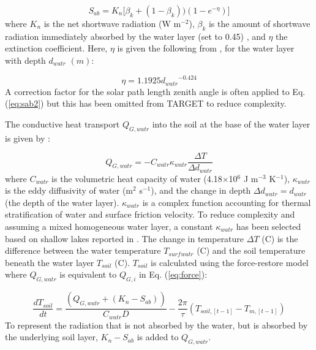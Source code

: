 \documentclass[gmd, manuscript]{copernicus}
\begin{document}
\begin{equation} 
\ensuremath{S_{ab}} = \ensuremath{K_{n}} \big[ \ensuremath{\beta_{k}} + (1 - \ensuremath{\beta_{k}}) )(1-e^{-\ensuremath{\eta}})  \big]
\label{eq:sab2} \end{equation} where \ensuremath{K_{n}} is the net shortwave radiation (W m$^{-2}$), \ensuremath{\beta_{k}} is the amount of shortwave radiation immediately absorbed by the water layer (set to 0.45) \citep{MolinaMartinez2006}, and \ensuremath{\eta} the extinction coefficient. Here, \ensuremath{\eta} is given the following from \cite{Subin2012a}, for the water layer with depth \ensuremath{d_{watr}} $(m)$:

\begin{equation} 
\ensuremath{\eta} = 1.1925 \ensuremath{d_{watr}}^{-0.424}
\label{eq:eta} \end{equation} A correction factor for the solar path length zenith angle is often applied to Eq. (\ref{eq:sab2}) \citep{MolinaMartinez2006} but this has been omitted from TARGET to reduce complexity. 

The conductive heat transport \ensuremath{Q_{G,watr}} into the soil at the base of the water layer is given by \cite{MolinaMartinez2006}:

\begin{equation} 
\ensuremath{Q_{G,watr}} = - \ensuremath{C_{watr}} \ensuremath{\kappa_{watr}} \frac{\Delta T}{\Delta \ensuremath{d_{watr}}}
\label{eq:gwatr} \end{equation} where \ensuremath{C_{watr}} is the volumetric heat capacity of water (4.18$\times$10$^{6}$ J m$^{-3}$ K$^{-1}$), \ensuremath{\kappa_{watr}} is the eddy diffusivity of water (m$^{2}$ s$^{-1}$), 
and the change in depth $\Delta \ensuremath{d_{watr}} = \ensuremath{d_{watr}}$ (the depth of the water layer). \ensuremath{\kappa_{watr}} is a complex function accounting for thermal stratification of water and surface friction velocity. To reduce complexity and assuming a mixed homogeneous water layer, a constant \ensuremath{\kappa_{watr}} has been selected based on shallow lakes reported in \cite{SalasDeLeon2016}. The change in temperature $\Delta T$ (\degree C) is the difference between the water temperature $T_{surf}$$_{watr}$ (\degree C) and the soil temperature beneath the water layer \ensuremath{T_{soil}} (\degree C). \ensuremath{T_{soil}} is calculated using the force-restore model where \ensuremath{Q_{G,watr}} is equivalent to \ensuremath{Q_{G,i}} in Eq. (\ref{eq:force}):

\begin{equation}
\frac{d \ensuremath{T_{soil}}}{d t}= \frac{(\ensuremath{Q_{G,watr}} + (\ensuremath{K_{n}} - \ensuremath{S_{ab}}))}{C_{watr} D} - \frac{2 \pi}{\tau} (T_{soil,[t-1]} - T_{m,[t-1]})
\end{equation} To represent the radiation that is not absorbed by the water, but is absorbed by the underlying soil layer, $\ensuremath{K_{n}} - \ensuremath{S_{ab}}$ is added to \ensuremath{Q_{G,watr}}.
\end{document}
